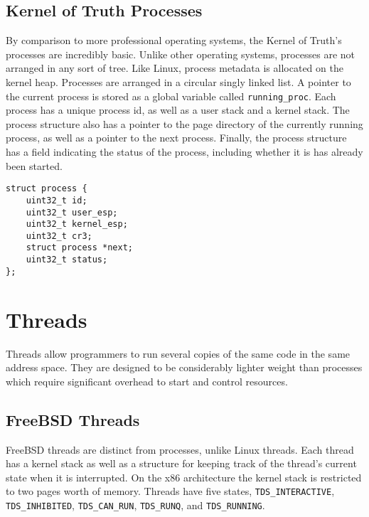 \documentclass[10pt,conference,draftclsnofoot,onecolumn]{IEEEtran}
\begin{document}
\subsection{Kernel of Truth Processes}
By comparison to more professional operating systems, the Kernel of Truth's processes are incredibly basic. Unlike other operating systems, processes are not arranged in any sort of tree. Like Linux, process metadata is allocated on the kernel heap. Processes are arranged in a circular singly linked list. A pointer to the current process is stored as a global variable called \texttt{running\_proc}. Each process has a unique process id, as well as a user stack and a kernel stack. The process structure also has a pointer to the page directory of the currently running process, as well as a pointer to the next process. Finally, the process structure has a field indicating the status of the process, including  whether it is has already been started.

\begin{lstlisting}
struct process {
    uint32_t id;
    uint32_t user_esp;
    uint32_t kernel_esp;
    uint32_t cr3;
    struct process *next;
    uint32_t status;
};
\end{lstlisting}

\section{Threads}
Threads allow programmers to run several copies of the same code in the same address space. They are designed to be considerably lighter weight than processes which require significant overhead to start and control resources.

\subsection{FreeBSD Threads}
FreeBSD threads are distinct from processes, unlike Linux threads. Each thread has a kernel stack as well as a structure for keeping track of the thread's current state when it is interrupted. On the x86 architecture the kernel stack is restricted to two pages worth of memory. Threads have five states, \texttt{TDS\_INTERACTIVE}, \texttt{TDS\_INHIBITED}, \texttt{TDS\_CAN\_RUN}, \texttt{TDS\_RUNQ}, and \texttt{TDS\_RUNNING}\cite{3_mckusick_neville-neil_watson_2015}.
\end{document}
